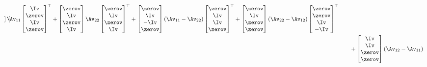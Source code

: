 \documentclass{ctexart}
\begin{document}
\begin{align*}
\begin{bmatrix}
    \end{bmatrix} \Av_{11}
    \begin{bmatrix}
        \Iv \\ \zerov \\ \Iv \\ \zerov
    \end{bmatrix}^\top +
    \begin{bmatrix}
        \zerov \\ \Iv \\ \zerov \\ \Iv
    \end{bmatrix} \Av_{22}
    \begin{bmatrix}
        \zerov \\ \Iv \\ \zerov \\ \Iv
    \end{bmatrix}^\top +
    \begin{bmatrix}
        \zerov \\ \Iv \\ -\Iv \\ \zerov
    \end{bmatrix} (\Av_{11} - \Av_{22})
    \begin{bmatrix}
        \zerov \\ \Iv \\ \Iv \\ \zerov
    \end{bmatrix}^\top +
    \begin{bmatrix}
        \zerov \\ \Iv \\ \zerov \\ \zerov
    \end{bmatrix} (\Av_{22} - \Av_{12})
    \begin{bmatrix}
        \zerov \\ \zerov \\ \Iv \\ -\Iv
    \end{bmatrix}^\top                                                                                                                                                                                                \\
     & \qquad +
    \begin{bmatrix}
        \Iv \\ \Iv \\ \zerov \\ \zerov
    \end{bmatrix} (\Av_{12} - \Av_{11})

\end{align*}
\end{document}
